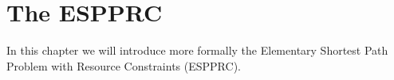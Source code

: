 \chapter{The ESPPRC}
In this chapter we will introduce more formally the Elementary Shortest Path Problem with Resource Constraints (ESPPRC).
